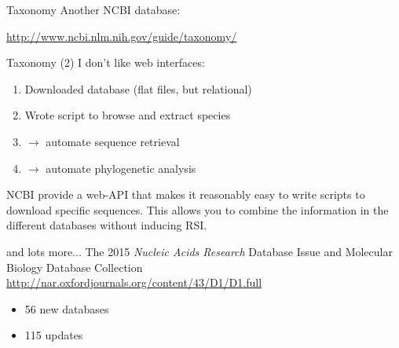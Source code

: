 \documentclass[pdf]{beamer}
\begin{document}
\begin{frame}{Taxonomy}
  Another NCBI database:

  \url{http://www.ncbi.nlm.nih.gov/guide/taxonomy/}

\end{frame}

\begin{frame}{Taxonomy (2)}
  I don't like web interfaces:
  \begin{enumerate}
  \item Downloaded database (flat files, but relational)
  \item Wrote script to browse and extract species
  \item $\rightarrow$ automate sequence retrieval
  \item $\rightarrow$ automate phylogenetic analysis
  \end{enumerate}
  
  NCBI provide a web-API that makes it reasonably easy to write scripts to
  download specific sequences. This allows you to combine the information in
  the different databases without inducing RSI.

\end{frame}

\begin{frame}{and lots more...}
  The 2015 \emph{Nucleic Acids Research} Database Issue
  and Molecular Biology Database Collection\\
  {\small
    \url{http://nar.oxfordjournals.org/content/43/D1/D1.full}
  }

  \begin{itemize}
  \item 56 new databases
  \item 115 updates
  \end{itemize}
  
\end{frame}
\end{document}
